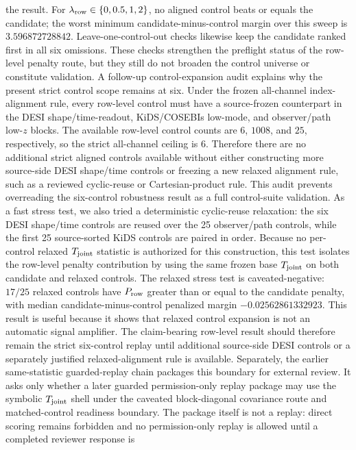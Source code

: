 the result.  For \(\lambda_{\rm row}\in\{0,0.5,1,2\}\), no aligned control beats
or equals the candidate; the worst minimum candidate-minus-control margin over
this sweep is \(3.596872728842\).  Leave-one-control-out checks likewise keep
the candidate ranked first in all six omissions.  These checks strengthen the
preflight status of the row-level penalty route, but they still do not broaden
the control universe or constitute validation.
A follow-up control-expansion audit explains why the present strict control
scope remains at six.  Under the frozen all-channel index-alignment rule, every
row-level control must have a source-frozen counterpart in the DESI
shape/time-readout, KiDS/COSEBIs low-mode, and observer/path low-\(z\) blocks.
The available row-level control counts are \(6\), \(1008\), and \(25\),
respectively, so the strict all-channel ceiling is \(6\).  Therefore there are
no additional strict aligned controls available without either constructing
more source-side DESI shape/time controls or freezing a new relaxed alignment
rule, such as a reviewed cyclic-reuse or Cartesian-product rule.  This audit
prevents overreading the six-control robustness result as a full control-suite
validation.
As a fast stress test, we also tried a deterministic cyclic-reuse relaxation:
the six DESI shape/time controls are reused over the 25 observer/path controls,
while the first 25 source-sorted KiDS controls are paired in order.  Because no
per-control relaxed \(T_{\rm joint}\) statistic is authorized for this
construction, this test isolates the row-level penalty contribution by using
the same frozen base \(T_{\rm joint}\) on both candidate and relaxed controls.
The relaxed stress test is caveated-negative: \(17/25\) relaxed controls have
\(P_{\rm row}\) greater than or equal to the candidate penalty, with median
candidate-minus-control penalized margin \(-0.02562861332923\).  This result is
useful because it shows that relaxed control expansion is not an automatic
signal amplifier.  The claim-bearing row-level result should therefore remain
the strict six-control replay until additional source-side DESI controls or a
separately justified relaxed-alignment rule is available.
Separately, the earlier same-statistic guarded-replay chain packages this
boundary for external review.  It asks only whether a later guarded permission-only replay
package may use the symbolic \(T_{\rm joint}\) shell under the caveated
block-diagonal covariance route and matched-control readiness boundary.  The
package itself is not a replay: direct scoring remains forbidden and no
permission-only replay is allowed until a completed reviewer response is
